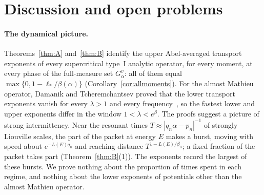 \section{Discussion and open problems}\label{sec:discussion}

\paragraph{The dynamical picture.} Theorems~\ref{thm:A} and~\ref{thm:B} identify the upper Abel-averaged transport exponents of every supercritical type~I analytic operator, for every moment, at every phase of the full-measure set $G^v_\alpha$: all of them equal $\max\{0,1-\ell_*/\beta(\alpha)\}$ (Corollary~\ref{cor:allmoments}). For the almost Mathieu operator, Damanik and Tcheremchantsev proved that the lower transport exponents vanish for every $\lambda>1$ and every frequency~\cite{DT2007}, so the fastest lower and upper exponents differ in the window $1<\lambda<e^{\beta}$. The proofs suggest a picture of strong intermittency. Near the resonant times $T\approx|q_n\alpha-p_n|^{-1}$ of strongly Liouville scales, the part of the packet at energy $E$ makes a burst, moving with speed about $e^{-L(E)q_n}$ and reaching distance $T^{1-L(E)/\beta_n}$; a fixed fraction of the packet takes part (Theorem~\ref{thm:B}(1)). The exponents record the largest of these bursts. We prove nothing about the proportion of times spent in each regime, and nothing about the lower exponents of potentials other than the almost Mathieu operator.

